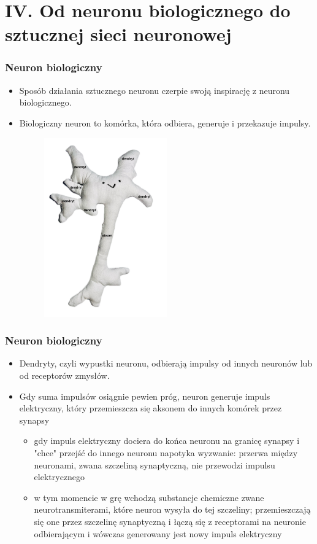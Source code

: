 \documentclass{beamer}
\begin{document}
\section{IV. Od neuronu biologicznego do sztucznej sieci neuronowej}

\begin{frame}[fragile]
\frametitle{Neuron biologiczny}
 \begin{itemize}
\item Sposób działania sztucznego neuronu czerpie swoją inspirację z neuronu biologicznego.
\item Biologiczny neuron to komórka, która odbiera, generuje i przekazuje impulsy. 

                    \begin{figure}[h]
                        \centering
                        \includegraphics[width=0.5\textwidth]{../../img/neuron_mt2.png}
                    \end{figure}                    
                    \end{itemize}
\end{frame}

\begin{frame}[fragile]
\frametitle{Neuron biologiczny}
\begin{itemize}
\item Dendryty, czyli wypustki neuronu, odbierają impulsy od innych neuronów lub od receptorów zmysłów.
\item Gdy suma impulsów osiągnie pewien próg, neuron generuje impuls elektryczny, który przemieszcza się aksonem do innych komórek przez synapsy 
	\begin{itemize}
	\item gdy impuls elektryczny dociera do końca neuronu na granicę synapsy i "chce" przejść do innego neuronu napotyka wyzwanie: przerwa między neuronami, zwana szczeliną synaptyczną, nie przewodzi impulsu elektrycznego
	\item w tym momencie w grę wchodzą substancje chemiczne zwane neurotransmiterami, które neuron wysyła do tej szczeliny; przemieszczają się one przez szczelinę synaptyczną i łączą się z receptorami na neuronie odbierającym i wówczas generowany jest nowy impuls elektryczny
	\end{itemize}
\end{itemize}
\end{frame}
\end{document}
